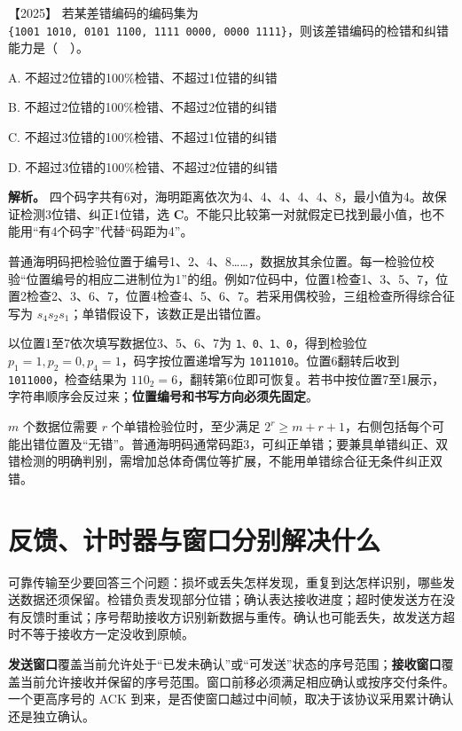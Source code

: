 \noindent{}【2025】 若某差错编码的编码集为 \allowbreak{}\texttt{\{1001\ 1010,}\allowbreak{}\texttt{\ 0101\ 1100,}\allowbreak{}\texttt{\ 1111\ 0000,}\allowbreak{}\texttt{\ 0000\ 1111\}}，则该差错编码的检错和纠错能力是（　）。

A. 不超过2位错的100\%检错、不超过1位错的纠错

B. 不超过2位错的100\%检错、不超过2位错的纠错

C. 不超过3位错的100\%检错、不超过1位错的纠错

D. 不超过3位错的100\%检错、不超过2位错的纠错


\textbf{解析。} 四个码字共有6对，海明距离依次为4、4、4、4、4、8，最小值为4。故保证检测3位错、纠正1位错，选 \textbf{C}。不能只比较第一对就假定已找到最小值，也不能用``有4个码字''代替``码距为4''。

普通海明码把检验位置于编号1、2、4、8\ldots\ldots，数据放其余位置。每一检验位校验``位置编号的相应二进制位为1''的组。例如7位码中，位置1检查1、3、5、7，位置2检查2、3、6、7，位置4检查4、5、6、7。若采用偶校验，三组检查所得综合征写为 \(s_4s_2s_1\)；单错假设下，该数正是出错位置。

以位置1至7依次填写数据位3、5、6、7为 \allowbreak{}\texttt{1、0、1、0}，得到检验位 \(p_1=1,p_2=0,p_4=1\)，码字按位置递增写为 \allowbreak{}\texttt{1011010}。位置6翻转后收到 \allowbreak{}\texttt{1011000}，检查结果为 \(110_2=6\)，翻转第6位即可恢复。若书中按位置7至1展示，字符串顺序会反过来；\textbf{位置编号和书写方向必须先固定}。

\(m\) 个数据位需要 \(r\) 个单错检验位时，至少满足 \(2^r\ge m+r+1\)，右侧包括每个可能出错位置及``无错''。普通海明码通常码距3，可纠正单错；要兼具单错纠正、双错检测的明确判别，需增加总体奇偶位等扩展，不能用单错综合征无条件纠正双错。

\section{反馈、计时器与窗口分别解决什么}\label{cn-03-05}

可靠传输至少要回答三个问题：损坏或丢失怎样发现，重复到达怎样识别，哪些发送数据还须保留。检错负责发现部分位错；确认表达接收进度；超时使发送方在没有反馈时重试；序号帮助接收方识别新数据与重传。确认也可能丢失，故发送方超时不等于接收方一定没收到原帧。

\textbf{发送窗口}覆盖当前允许处于``已发未确认''或``可发送''状态的序号范围；\textbf{接收窗口}覆盖当前允许接收并保留的序号范围。窗口前移必须满足相应确认或按序交付条件。一个更高序号的 ACK 到来，是否使窗口越过中间帧，取决于该协议采用累计确认还是独立确认。

